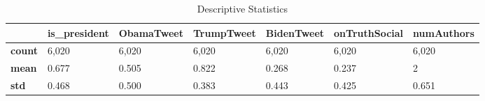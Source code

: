 \begin{table}
\caption{Descriptive Statistics}
\label{tab:descstats}
\begin{tabular}{lllllll}
\toprule
 & is_president & ObamaTweet & TrumpTweet & BidenTweet & onTruthSocial & numAuthors \\
\midrule
\textbf{count} & 6,020 & 6,020 & 6,020 & 6,020 & 6,020 & 6,020 \\
\textbf{mean} & 0.677 & 0.505 & 0.822 & 0.268 & 0.237 & 2 \\
\textbf{std} & 0.468 & 0.500 & 0.383 & 0.443 & 0.425 & 0.651 \\
\bottomrule
\end{tabular}
\end{table}
